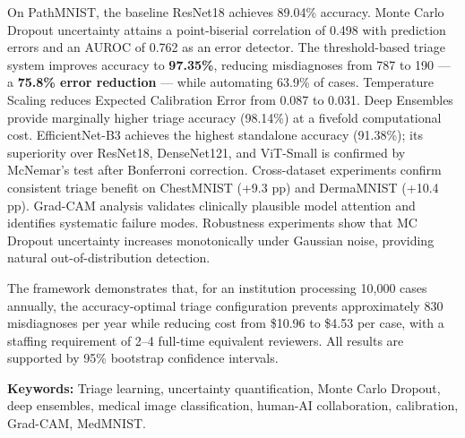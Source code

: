 \documentclass[12pt,a4paper]{report}
\begin{document}
On PathMNIST, the baseline ResNet18 achieves 89.04\% accuracy. Monte
Carlo Dropout uncertainty attains a point-biserial correlation of 0.498
with prediction errors and an AUROC of 0.762 as an error detector. The
threshold-based triage system improves accuracy to \textbf{97.35\%},
reducing misdiagnoses from 787 to 190 --- a \textbf{75.8\% error
reduction} --- while automating 63.9\% of cases.
Temperature Scaling reduces Expected Calibration Error from 0.087 to
0.031. Deep Ensembles provide marginally higher triage accuracy
(98.14\%) at a fivefold computational cost. EfficientNet-B3 achieves
the highest standalone accuracy (91.38\%); its superiority over
ResNet18, DenseNet121, and ViT-Small is confirmed by McNemar's test
after Bonferroni correction. Cross-dataset experiments confirm
consistent triage benefit on ChestMNIST (+9.3 pp) and DermaMNIST
(+10.4 pp). Grad-CAM analysis validates clinically plausible model
attention and identifies systematic failure modes. Robustness
experiments show that MC Dropout uncertainty increases monotonically
under Gaussian noise, providing natural out-of-distribution detection.

The framework demonstrates that, for an institution processing 10,000
cases annually, the accuracy-optimal triage configuration prevents
approximately 830 misdiagnoses per year while reducing cost from
\$10.96 to \$4.53 per case, with a staffing requirement of 2--4
full-time equivalent reviewers. All results are supported by 95\%
bootstrap confidence intervals.

\vspace{0.6cm}

\noindent\textbf{Keywords:} Triage learning, uncertainty quantification,
Monte Carlo Dropout, deep ensembles, medical image classification,
human-AI collaboration, calibration, Grad-CAM, MedMNIST.

\newpage
\pagestyle{plain}
\tableofcontents

\newpage
\listoffigures
{}

\newpage
\listoftables
{}
\end{document}
